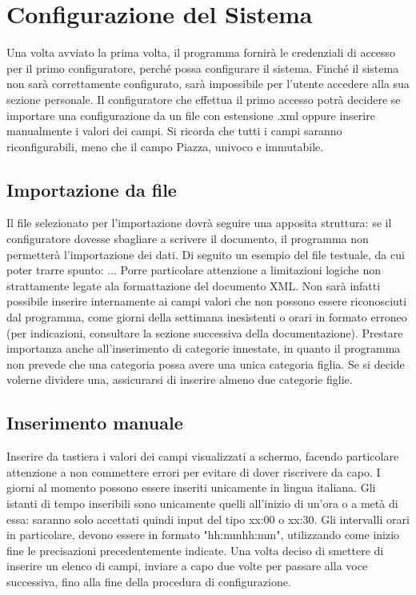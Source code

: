 
\section{Configurazione del Sistema}
Una volta avviato la prima volta, il programma fornirà le credenziali di accesso per il primo configuratore, perché possa configurare il sistema.
Finché il sistema non sarà correttamente configurato, sarà impossibile per l'utente accedere alla sua sezione personale.
Il configuratore che effettua il primo accesso potrà decidere se importare una configurazione da un file con estensione .xml oppure inserire manualmente i valori dei campi.
Si ricorda che tutti i campi saranno riconfigurabili, meno che il campo Piazza, univoco e immutabile.

\subsection{Importazione da file}
Il file selezionato per l'importazione dovrà seguire una apposita struttura: se il configuratore dovesse sbagliare a scrivere il documento, il programma non permetterà l'importazione dei dati.
Di seguito un esempio del file testuale, da cui poter trarre spunto:
...
Porre particolare attenzione a limitazioni logiche non strattamente legate ala formattazione del documento XML.
Non sarà infatti possibile inserire internamente ai campi valori che non possono essere riconosciuti dal programma, come giorni della settimana inesistenti o orari in formato erroneo (per indicazioni, consultare la sezione successiva della documentazione).
Prestare importanza anche all'inserimento di categorie innestate, in quanto il programma non prevede che una categoria possa avere una unica categoria figlia. Se si decide volerne dividere una, assicurarsi di inserire almeno due categorie figlie.

\subsection{Inserimento manuale}
Inserire da tastiera i valori dei campi visualizzati a schermo, facendo particolare attenzione a non commettere errori per evitare di dover riscrivere da capo.
I giorni al momento possono essere inseriti unicamente in lingua italiana.
Gli istanti di tempo inseribili sono unicamente quelli all'inizio di un'ora o a metà di essa: saranno solo accettati quindi input del tipo xx:00 o xx:30.
Gli intervalli orari in particolare, devono essere in formato "hh:mm\-hh:mm", utilizzando come inizio fine le precisazioni precedentemente indicate.
Una volta deciso di smettere di inserire un elenco di campi, inviare a capo due volte per passare alla voce successiva, fino alla fine della procedura di configurazione.

